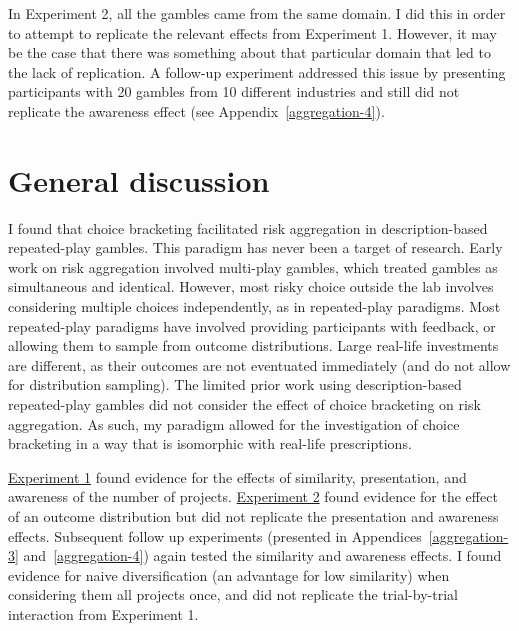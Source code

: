 \documentclass[a4paper, nobind, dvipsnames]{templates/ociamthesis}
\theoremstyle{definition}
\theoremstyle{definition}
\theoremstyle{definition}
\theoremstyle{definition}
\theoremstyle{remark}
\begin{document}
In Experiment 2, all the gambles came from the same domain. I did this in order
to attempt to replicate the relevant effects from Experiment 1. However, it may
be the case that there was something about that particular domain that led to
the lack of replication. A follow-up experiment addressed this issue by
presenting participants with 20 gambles from 10 different industries and still
did not replicate the awareness effect (see Appendix~\ref{aggregation-4}).

\hypertarget{general-discussion}{%
\section{General discussion}\label{general-discussion}}

I found that choice bracketing facilitated risk aggregation in description-based
repeated-play gambles. This paradigm has never been a target of research. Early
work on risk aggregation involved multi-play gambles, which treated gambles as
simultaneous and identical. However, most risky choice outside the lab involves
considering multiple choices independently, as in repeated-play paradigms. Most
repeated-play paradigms have involved providing participants with feedback, or
allowing them to sample from outcome distributions. Large real-life investments
are different, as their outcomes are not eventuated immediately (and do not
allow for distribution sampling). The limited prior work using description-based
repeated-play gambles did not consider the effect of choice bracketing on risk
aggregation. As such, my paradigm allowed for the investigation of choice
bracketing in a way that is isomorphic with real-life prescriptions.

\protect\hyperlink{aggregation-1}{Experiment 1} found evidence for the effects of similarity,
presentation, and awareness of the number of projects. \protect\hyperlink{aggregation-2}{Experiment
2} found evidence for the effect of an outcome distribution but
did not replicate the presentation and awareness effects. Subsequent follow up
experiments (presented in Appendices~\ref{aggregation-3}
and~\ref{aggregation-4}) again tested the similarity and awareness effects. I
found evidence for naive diversification (an advantage for low similarity) when
considering them all projects once, and did not replicate the trial-by-trial
interaction from Experiment 1.
\end{document}
